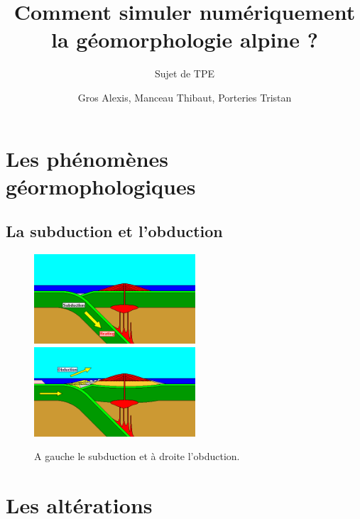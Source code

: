 \documentclass{beamer}
\title{Comment simuler numériquement la géomorphologie alpine ?}
\subtitle{Sujet de TPE}
\author{Gros Alexis, Manceau Thibaut, Porteries Tristan}
\begin{document}
\frame{\titlepage}

\section{Les phénomènes géormophologiques}
\subsection{La subduction et l'obduction}
\begin{frame}
  \begin{figure}
    \begin{center}
      \includegraphics[width=6cm]{Images/subduction.png}
      \includegraphics[width=6cm]{Images/obduction.png}
      \caption{A gauche le subduction et à droite l'obduction.}
    \end{center}
  \end{figure}
\end{frame}

\section{Les altérations}
\end{document}
